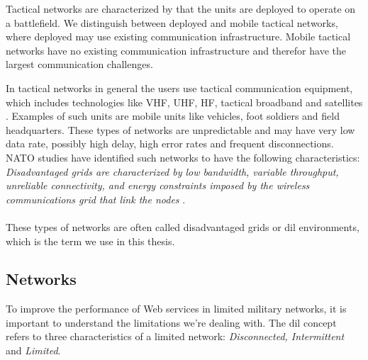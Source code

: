 Tactical networks are characterized by that the units are deployed to operate on
a battlefield. We distinguish between deployed and mobile tactical networks,
where deployed may use existing communication infrastructure. Mobile tactical
networks have no existing communication infrastructure and therefor have the
largest communication challenges.

 In tactical networks in general the users use tactical communication equipment,
 which includes technologies like VHF, UHF, HF, tactical broadband and
 satellites \cite{ist-090}. Examples of such units are mobile units like
 vehicles, foot soldiers and field headquarters. These types of networks are
 unpredictable and may have very low data rate, possibly high delay, high error
 rates and frequent disconnections.  NATO studies\cite{nato-disadvantaged-grids}
 have identified such networks to have the following characteristics: \\

\textit{
Disadvantaged grids are characterized by low bandwidth, variable throughput,
unreliable connectivity, and energy constraints imposed by the wireless
communications grid that link the nodes
}.

\paragraph{}

These types of networks are often called disadvantaged grids or \gls{dil}
environments, which is the term we use in this thesis.

\subsection{ Networks}
\label{dil}

To improve the performance of Web services in limited military networks, it is
important to understand the limitations we're dealing with. The \gls{dil}
concept refers to three characteristics of a limited network:
\textit{Disconnected, Intermittent} and \textit{Limited}.

